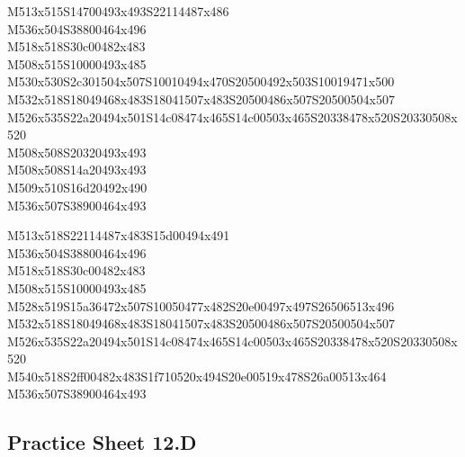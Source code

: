 \documentclass{article}
\begin{document}
\begin{multicols}{5}
\begin{center}
M513x515S14700493x493S22114487x486 %
\\M536x504S38800464x496 %
\\M518x518S30c00482x483 %
\\M508x515S10000493x485 %
\\M530x530S2c301504x507S10010494x470S20500492x503S10019471x500 %
\\M532x518S18049468x483S18041507x483S20500486x507S20500504x507 %
\\M526x535S22a20494x501S14c08474x465S14c00503x465S20338478x520S20330508x520 %
\\M508x508S20320493x493 %
\\M508x508S14a20493x493 %
\\M509x510S16d20492x490 %
\\M536x507S38900464x493 %
\vfil
\columnbreak

M513x518S22114487x483S15d00494x491 %
\\M536x504S38800464x496 %
\\M518x518S30c00482x483 %
\\M508x515S10000493x485 %
\\M528x519S15a36472x507S10050477x482S20e00497x497S26506513x496 %
\\M532x518S18049468x483S18041507x483S20500486x507S20500504x507 %
\\M526x535S22a20494x501S14c08474x465S14c00503x465S20338478x520S20330508x520 %
\\M540x518S2ff00482x483S1f710520x494S20e00519x478S26a00513x464 %
\\M536x507S38900464x493 %
\vfil

\end{center}
\end{multicols}

\subsection{Practice Sheet 12.D}
\end{document}
